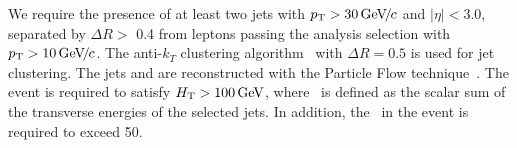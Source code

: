 We require the presence of at least two jets with  $p_{\mathrm{T}} > 30{\,\text{Ge\hspace{-.08em}V\hspace{-0.16em}/\hspace{-0.08em}}c}$ and  $|\eta| < 3.0$,
separated  by $\Delta  R  >$  0.4 from  leptons  passing the  analysis
selection   with   $p_{\mathrm{T}}  >   10{\,\text{Ge\hspace{-.08em}V\hspace{-0.16em}/\hspace{-0.08em}}c}$.    The  anti-$k_T$   clustering
algorithm~\cite{antikt}  with  $\Delta{}R  =  0.5$  is  used  for  jet
clustering. The jets and \MET  are reconstructed with the Particle Flow 
technique~\cite{CMS-PAS-PFT-10-002}. 
The event is required to satisfy $H_{\mathrm{T}} > 100\,\text{Ge\hspace{-.08em}V}$, where \HT\ is defined as
the scalar  sum of the transverse  energies of the  selected jets.  In
addition,  the  \MET\ in  the event is required to exceed  50\GeV.
